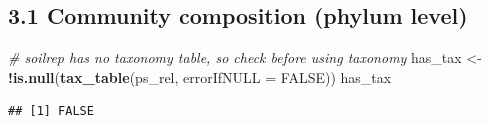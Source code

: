 \documentclass[
]{article}
\newenvironment{Shaded}{\begin{snugshade}}{\end{snugshade}}
\newcommand{\AttributeTok}[1]{\textcolor[rgb]{0.13,0.29,0.53}{#1}}
\newcommand{\CommentTok}[1]{\textcolor[rgb]{0.56,0.35,0.01}{\textit{#1}}}
\newcommand{\ConstantTok}[1]{\textcolor[rgb]{0.56,0.35,0.01}{#1}}
\newcommand{\FunctionTok}[1]{\textcolor[rgb]{0.13,0.29,0.53}{\textbf{#1}}}
\newcommand{\NormalTok}[1]{#1}
\newcommand{\OtherTok}[1]{\textcolor[rgb]{0.56,0.35,0.01}{#1}}
\newcommand{\SpecialCharTok}[1]{\textcolor[rgb]{0.81,0.36,0.00}{\textbf{#1}}}
\begin{document}
\subsection{3.1 Community composition (phylum
level)}\label{community-composition-phylum-level}

\begin{Shaded}
\begin{Highlighting}[]
\CommentTok{\# soilrep has no taxonomy table, so check before using taxonomy}
\NormalTok{has\_tax }\OtherTok{\textless{}{-}} \SpecialCharTok{!}\FunctionTok{is.null}\NormalTok{(}\FunctionTok{tax\_table}\NormalTok{(ps\_rel, }\AttributeTok{errorIfNULL =} \ConstantTok{FALSE}\NormalTok{))}
\NormalTok{has\_tax}
\end{Highlighting}
\end{Shaded}

\begin{verbatim}
## [1] FALSE
\end{verbatim}
\end{document}
